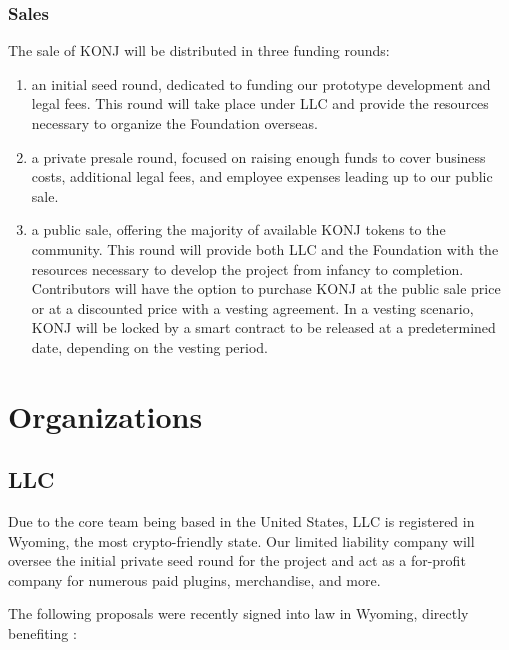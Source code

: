 \documentclass{kwp-builder}
\begin{document}
\subsubsection{Sales}

\tab The sale of KONJ will be distributed in three funding rounds:

\begin{enumerate}[label=(\alph*),leftmargin=2.5\parindent]
	\item an initial seed round, dedicated to funding our prototype development and legal fees. This round will take place under \konjure LLC and provide the resources necessary to organize the \konjure Foundation overseas.
	
	\item a private presale round, focused on raising enough funds to cover business costs, additional legal fees, and employee expenses leading up to our public sale.
	
	\item a public sale, offering the majority of available KONJ tokens to the community. This round will provide both \konjure LLC and the \konjure Foundation with the resources necessary to develop the project from infancy to completion. Contributors will have the option to purchase KONJ at the public sale price or at a discounted price with a vesting agreement. In a vesting scenario, KONJ will be locked by a smart contract to be released at a predetermined date, depending on the vesting period.
\end{enumerate}


\newpage

\section{Organizations}
\subsection{\konjure LLC}

\tab Due to the core \konjure team being based in the United States, \konjure LLC is registered in Wyoming, the most crypto-friendly state. Our limited liability company will oversee the initial private seed round for the project and act as a for-profit company for numerous paid plugins, merchandise, and more.\bigskip

The following proposals were recently signed into law in Wyoming, directly benefiting \konjure:
\end{document}
